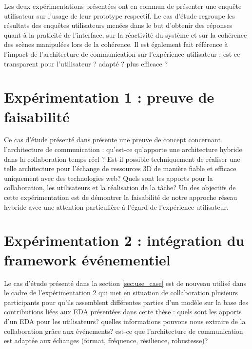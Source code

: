 Les deux expérimentations présentées ont en commun de présenter une enquête 
utilisateur sur l'usage de leur prototype respectif. Le cas d'étude regroupe les 
résultats des enquêtes utilisateurs menées dans le but d'obtenir des réponses 
quant à la praticité de l'interface, sur la réactivité du système et sur la 
cohérence des scènes manipulées lors de la cohérence. Il est également fait 
référence à l'impact de l'architecture de communication sur l'expérience utilisateur 
: est-ce transparent pour l'utilisateur ? adapté ? plus efficace ?




\section{Expérimentation 1 : preuve de faisabilité}

Ce cas d'étude présenté dans \cite{Desprat2015a, Desprat2015b} présente 
une preuve de concept concernant l'architecture de communication : qu'est-ce 
qu'apporte une architecture hybride dans la collaboration temps réel ? Est-il 
possible techniquement de réaliser une 
telle architecture pour l'échange de ressources \gls{3D} de manière fiable et 
efficace 
uniquement avec des technologies web? Quels sont les apports pour la 
collaboration, les utilisateurs et la réalisation de la tâche?
Un des objectifs de cette expérimentation est de démontrer la faisabilité de notre 
approche réseau hybride avec une attention particulière à l'égard de l'expérience 
utilisateur.



\section{Expérimentation 2 : intégration du framework événementiel}
\label{sec:xp2}

Le cas d'étude présenté dans la section \ref{sec:use_case} est de nouveau utilisé 
dans le cadre de l'expérimentation 2 qui met en situation de collaboration plusieurs 
participants pour qu'ils assemblent différentes parties d'un modèle sur la base des 
contributions liées aux \gls{EDA} présentées dans cette thèse : quels sont les 
apports d'un \gls{EDA} pour les utilisateurs? quelles informations pouvons nous 
extraire de la collaboration grâce aux événements? est-ce que l'architecture de 
communication est adaptée aux échanges (format, fréquence, résilience, 
robustesse)? 






